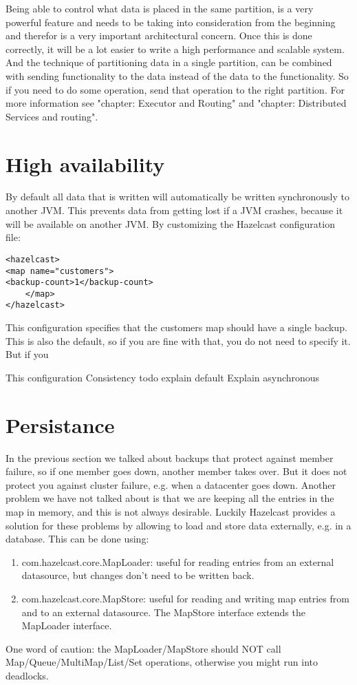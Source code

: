 Being able to control what data is placed in the same partition, is a very powerful feature and needs to be taking into consideration from the beginning and therefor is a very important architectural concern. Once this is done correctly, it will be a lot easier to write a high performance and scalable system. And the technique of partitioning data in a single partition, can be combined with sending functionality to the data instead of the data to the functionality. So if you need to do some operation, send that operation to the right partition. For more information see "chapter: Executor and Routing" and "chapter: Distributed Services and routing".

\section{High availability}
By default all data that is written will automatically be written synchronously to another JVM. This prevents data from getting lost if a JVM crashes, because it will be available on another JVM. By customizing the Hazelcast configuration file:
\begin{verbatim}
<hazelcast> 
<map name="customers"> 
<backup-count>1</backup-count>
 	</map> 
</hazelcast>
\end{verbatim}

This configuration specifies that the customers map should have a single backup. This is also the default, so if you are fine with that, you do not need to specify it. But if you 

This configuration 
Consistency
todo explain default
Explain asynchronous

\section{Persistance}
In the previous section we talked about backups that protect against member failure, so if one member goes down, another member takes over. But it does not protect you against cluster failure, e.g. when a datacenter goes down. Another problem we have not talked about is that we are keeping all the entries in the map in memory, and this is not always desirable. Luckily Hazelcast provides a solution for these problems by allowing to load and store data externally, e.g. in a database. This can be done using:
\begin{enumerate}
\item com.hazelcast.core.MapLoader: useful for reading entries from an external datasource, but changes don't need to be written back.
\item com.hazelcast.core.MapStore: useful for reading and writing map entries from and to an external datasource. The MapStore interface extends the MapLoader interface.
\end{enumerate}
One word of caution: the MapLoader/MapStore should NOT call Map/Queue/MultiMap/List/Set operations, otherwise you might run into deadlocks.


